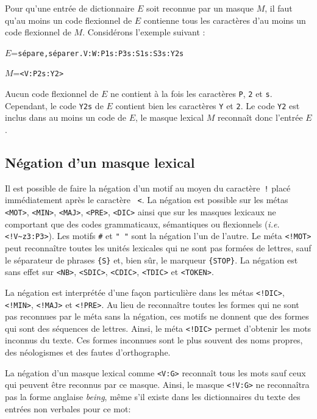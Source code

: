 \noindent Pour qu’une entrée de dictionnaire $E$ soit reconnue par un masque $M$, il faut qu’au
moins un code flexionnel de $E$ contienne tous les caractères d’au moins un code flexionnel de $M$.
Considérons l’exemple suivant :

\bigskip
$E$=\verb$sépare,séparer.V:W:P1s:P3s:S1s:S3s:Y2s$

$M$=\verb$<V:P2s:Y2>$

\bigskip
\noindent Aucun code flexionnel de $E$ ne contient à la fois les caractères \verb+P+, \verb+2+ et
\verb+s+. Cependant, le code \verb+Y2s+ de $E$ contient bien les caractères \verb+Y+ et \verb+2+. Le
code \verb+Y2+ est inclus dans au moins un code de $E$, le masque lexical $M$ reconnaît donc l’entrée $E$.


\subsection{Négation d’un masque lexical}
Il est possible de faire la négation d’un motif au moyen du caractère~\verb+!+ placé immédiatement
après le caractère ~\verb+<+. La négation est possible sur les métas \verb+<MOT>+, \verb+<MIN>+,
\verb+<MAJ>+, \verb+<PRE>+, \verb+<DIC>+  ainsi que sur les masques lexicaux ne comportant que des
codes grammaticaux, sémantiques ou flexionnels (\textit{i.e.} \verb$<!V~z3:P3>$). Les motifs
\verb+#+ et \verb+" "+  sont la négation l’un de l’autre.
\index{\verb+#+}
Le méta \verb$<!MOT>$ peut reconnaître toutes les unités lexicales qui ne sont pas formées de
lettres, sauf le séparateur de phrases \verb+{S}+ et, bien sûr, le marqueur \verb+{STOP}+.
La négation est sans effet sur \verb+<NB>+, \verb+<SDIC>+, \verb+<CDIC>+, \verb+<TDIC>+ et
\verb+<TOKEN>+.

\bigskip
\noindent La négation est interprétée d’une façon particulière dans les métas 
\verb+<!DIC>+, \verb+<!MIN>+, \verb+<!MAJ>+ et \verb+<!PRE>+.
Au lieu de reconnaître toutes les formes qui ne sont pas reconnues
par le méta sans la négation, ces motifs ne donnent que des formes qui sont des séquences
de lettres. Ainsi, le méta \verb+<!DIC>+ permet d’obtenir les mots inconnus du texte. Ces formes
inconnues sont le plus souvent des noms propres, des néologismes et des fautes d’orthographe.


\bigskip
\noindent La négation d’un masque lexical comme  \verb+<V:G>+ reconnaît tous les mots sauf ceux qui
peuvent être reconnus par ce masque. Ainsi, le masque \verb+<!V:G>+ ne reconnaîtra pas la forme
anglaise \emph{being}, même s’il existe dans les dictionnaires du texte des entrées non verbales pour ce
mot:



